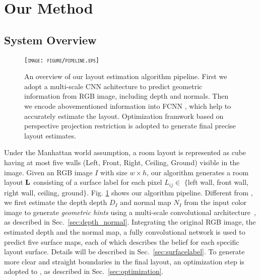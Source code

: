 \section{Our Method}
\label{sec:Meth}


\subsection{System Overview}
\label{subsection:overview}

\begin{figure}[!htq]
	\centering
	\textsc{\texttt{[image: figure/pipeline.eps]}}
	\caption{An overview of our layout estimation algorithm pipeline. First we adopt a multi-scale CNN achitecture to predict geometric information from RGB image, including depth and normals. Then we encode abovementioned information into FCNN , which help to accurately estimate the layout. Optimization framwork based on perspective projection restriction is adopted to generate final precise layout estimates.}
	\label{fig:pipeline}
\end{figure}

Under the Manhattan world assumption, a room layout is represented as cube having at most five walls (Left, Front, Right, Ceiling, Ground) visible in the image. 
%
Given an RGB image $I$ with  size $w\times h$, our algorithm generates a room layout $\mathbf{L}$ consisting of a surface label for each pixel $L_{ij}\in $ $\{$left wall, front wall, right wall, ceiling, ground$\}$. 
Fig. \ref{fig:pipeline} shows our algorithm pipeline. 
Different from \cite{dasgupta2016delay}, we first estimate the depth depth $D_{I}$ and normal map $N_{I}$ from the input color image to generate \emph{geometric hints} using a multi-scale convolutional architecture~\cite{eigen2015predicting}, as described in Sec.~\ref{sec:depth_normal}.
Integrating the original RGB image, the estimated depth and the normal map, a fully convolutional network is used to predict five surface maps, each of which describes the belief for each specific layout surface. Details will be described in Sec.~\ref{sec:surfacelabel}.
To generate more clear and straight boundaries in the final layout, an optimization step is adopted to , as described in Sec.~\ref{sec:optimization}.


 


